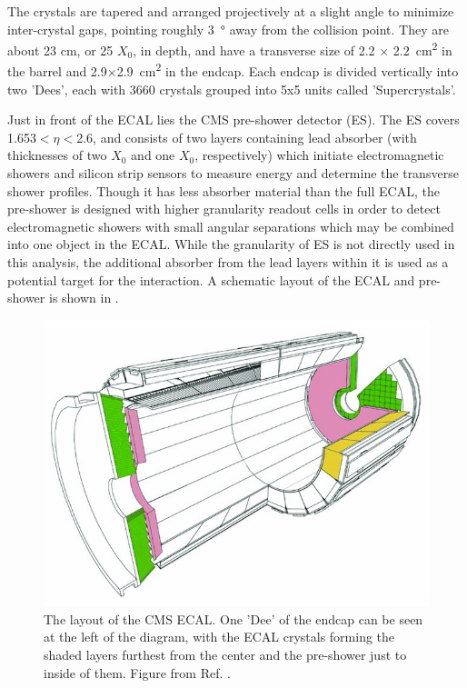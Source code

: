The crystals are tapered and arranged projectively at a slight angle to minimize inter-crystal gaps, pointing roughly \SI{3}{\degree} away from the collision point. 
They are about 23 cm, or 25 $X_0$, in depth, and have a transverse size of 2.2 $\times$ \SI{2.2}{\centi\meter^2} in the barrel and 2.9$\times$\SI{2.9}{\centi\meter^2} in the endcap. 
Each endcap is divided vertically into two 'Dees', each with 3660 crystals grouped into 5x5 units called 'Supercrystals'.

Just in front of the ECAL lies the CMS pre-shower detector (ES). 
The ES covers 1.653$<\eta<$2.6, and consists of two layers containing lead absorber (with thicknesses of two $X_0$ and one $X_0$, respectively) which initiate electromagnetic showers and silicon strip sensors to measure energy and determine the transverse shower profiles. 
Though it has less absorber material than the full ECAL, the pre-shower is designed with higher granularity readout cells in order to detect electromagnetic showers with small angular separations which may be combined into one object in the ECAL.
While the granularity of ES is not directly used in this analysis, the additional absorber from the lead layers within it is used as a potential target for the \dbrem interaction.
A schematic layout of the ECAL and pre-shower is shown in .

\begin{figure}[htbp]
    \includegraphics[width=\textwidth]{figures/ecal_layout.jpg}
    \centering
	\caption[The CMS Electromagnetic Calorimeter]{The layout of the CMS ECAL. One 'Dee' of the endcap can be seen at the left of the diagram, with the ECAL crystals forming the shaded layers furthest from the center and the pre-shower just to inside of them. Figure from Ref. \cite{cooke2022}.}
    \label{fig:ecalLayout}
\end{figure}

